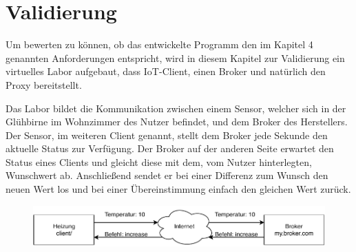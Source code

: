 \chapter{Validierung}
    
Um bewerten zu können, ob das entwickelte Programm den im Kapitel 4 genannten Anforderungen entspricht, wird in diesem Kapitel zur Validierung ein virtuelles Labor aufgebaut, dass \ac{IoT}-Client, einen Broker und natürlich den Proxy bereitstellt.

Das Labor bildet die Kommunikation zwischen einem Sensor, welcher sich in der Glühbirne im Wohnzimmer des Nutzer befindet, und dem Broker des Herstellers. Der Sensor, im weiteren Client genannt, stellt dem Broker jede Sekunde den aktuelle Status zur Verfügung. Der Broker auf der anderen Seite erwartet den Status eines Clients und gleicht diese mit dem, vom Nutzer hinterlegten, Wunschwert ab. Anschließend sendet er bei einer Differenz zum Wunsch den neuen Wert los und bei einer Übereinstimmung einfach den gleichen Wert zurück.

\begin{figure}[h]%
    \centering
    \includegraphics[width=14cm]{tex/bilder/6_validierung/Szenario1.pdf}
    \label{fig:darstellung-szenario}
\end{figure}

